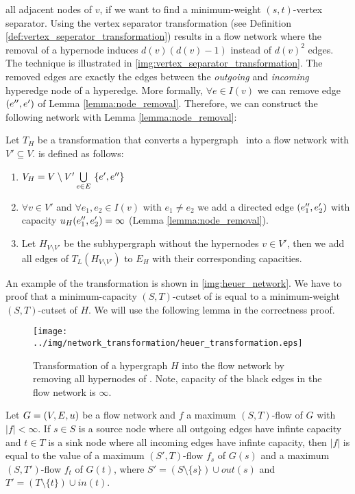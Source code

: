 all adjacent nodes of $v$, if we want to find a  minimum-weight $(s,t)$-vertex separator. 
Using the vertex separator transformation (see Definition \ref{def:vertex_seperator_transformation}) 
results in a flow network where the removal of a hypernode induces $d(v)(d(v)-1)$ instead of 
$d(v)^2$ edges. The technique is illustrated in \autoref{img:vertex_separator_transformation}.
The removed edges are exactly the edges between the \emph{outgoing} and \emph{incoming} hyperedge
node of a hyperedge. More formally, $\forall e \in I(v)$ we can remove edge 
$(e'',e')$ of Lemma \ref{lemma:node_removal}. Therefore, we can construct the
following network with Lemma \ref{lemma:node_removal}:

\begin{definition}
Let $T_H$ be a transformation that converts a hypergraph \HypergraphDef~into 
a flow network  with $V' \subseteq V$.  is defined as follows:
\begin{enumerate}
\item $V_H = V\setminus V' \bigcup\limits_{e \in E}\ \{e', e''\}$
\item $\forall v \in V'$ and $\forall e_1,e_2 \in I(v)$ with $e_1 \neq e_2$ we add a directed
      edge $(e_1'',e_2')$ with capacity $u_H(e_1'',e_2') = \infty$
      (Lemma \ref{lemma:node_removal}).
\item Let $H_{V \setminus V'}$ be the subhypergraph without the hypernodes $v \in V'$,
      then we add all edges of $T_L(H_{V \setminus V'})$ to $E_H$ with their corresponding capacities.
\end{enumerate} 
\end{definition}

An example of the transformation is shown in \autoref{img:heuer_network}.
We have to proof that a minimum-capacity $(S,T)$-cutset
of  is equal to a minimum-weight $(S,T)$-cutset of $H$. 
We will use the following lemma in the correctness proof.

\begin{figure}
\centering
\texttt{[image: ../img/network\_transformation/heuer\_transformation.eps]}
\caption{Transformation of a hypergraph $H$ into the flow network  by removing
         all hypernodes of . Note, capacity of the black edges in the flow network is $\infty$.}
\label{img:heuer_network}
\end{figure} 
\clearpage
\begin{lemma}
\label{lemma:source_and_sink_removal}
Let $G = (V,E,u)$ be a flow network and $f$ a maximum $(S,T)$-flow of $G$ with $|f| < \infty$.
If $s \in S$ is a source node where all outgoing edges have infinte capacity and
$t \in T$ is a sink node where all incoming edges have infinte capacity, then
$|f|$ is equal to the value of a maximum $(S',T)$-flow $f_s$ of $G(s)$ and a maximum
$(S,T')$-flow $f_t$ of $G(t)$, where $S' = (S\setminus \{s\}) \cup out(s)$ 
and $T' = (T \setminus \{t\}) \cup in(t)$.
\end{lemma}

